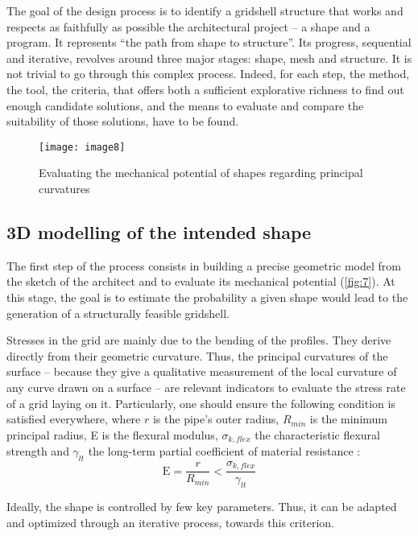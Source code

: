 The goal of the design process is to identify a gridshell structure that works and respects as faithfully as possible the architectural project – a shape and a program. It represents “the path from shape to structure”. Its progress, sequential and iterative, revolves around three major stages: shape, mesh and structure. It is not trivial to go through this complex process. Indeed, for each step, the method, the tool, the criteria, that offers both a sufficient explorative richness to find out enough candidate solutions, and the means to evaluate and compare the suitability of those solutions, have to be found.
\begin{figure}[t]
\centering
\texttt{[image: image8]}
\caption{Evaluating the mechanical potential of shapes regarding principal curvatures}
\label{fig:7}
\end{figure}

\subsection{3D modelling of the intended shape}
The first step of the process consists in building a precise geometric model from the sketch of the architect and to evaluate its mechanical potential (\autoref{fig:7}). At this stage, the goal is to estimate the probability a given shape would lead to the generation of a structurally feasible gridshell.

Stresses in the grid are mainly due to the bending of the profiles. They derive directly from their geometric curvature. Thus, the principal curvatures of the surface – because they give a qualitative measurement of the local curvature of any curve drawn on a surface – are relevant indicators to evaluate the stress rate of a grid laying on it. Particularly, one should ensure the following condition is satisfied everywhere, where $r$ is the pipe’s outer radius, $R_{min}$ is the minimum principal radius, E is the flexural modulus, $\sigma_{k,flex}$ the characteristic flexural strength and $\gamma_{lt}$ the long-term partial coefficient of material resistance :
\begin{equation}
	\mathrm{E} = \frac{r}{R_{min}} < \frac{\sigma_{k,flex}}{\gamma_{lt}} 
\end{equation}

Ideally, the shape is controlled by few key parameters. Thus, it can be adapted and optimized through an iterative process, towards this criterion.

